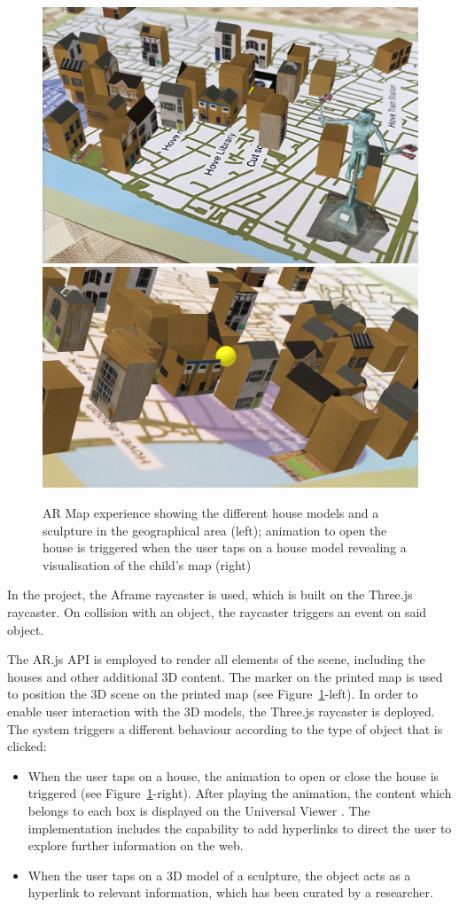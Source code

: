 \documentclass[acmlarge,screen,dvipsnames]{acmart}
\begin{document}
\begin{figure}[ht] \centering
\includegraphics[width=0.48\linewidth]{images/ARcontentw_sculpture.png}
\includegraphics[width=0.48\linewidth]{images/animationARexperience_zoom.png}
\caption{AR Map experience showing the different house models and a sculpture in the geographical area (left); animation to open the house is triggered when the user taps on a house model revealing a visualisation
 of the child's map (right)} \label{fig:ARexperience}
\end{figure}
 
In the project, the Aframe raycaster is used, which is built
on the Three.js raycaster. On collision with an object, the raycaster triggers
an event on said object. 

The AR.js API is employed to render all elements of the scene, including the
houses and other additional 3D content. The marker on the printed map is used
to position the 3D scene on the printed map (see
Figure~\ref{fig:ARexperience}-left). In order to enable user interaction with
the 3D models, the Three.js raycaster is deployed. The system triggers a different
behaviour according to the type of object that is clicked: 

\begin{itemize}
\item When the user taps on a house, the animation to open or close the house
is triggered (see Figure~\ref{fig:ARexperience}-right). After playing the
animation, the content which belongs to each box is displayed on the Universal
Viewer \cite{uv}. The implementation includes the capability to add hyperlinks
to direct the user to explore further information on the web. 
\item When the
user taps on a 3D model of a sculpture, the object acts as a hyperlink to
relevant information, which has been curated by a researcher.  
\end{itemize}
\end{document}
